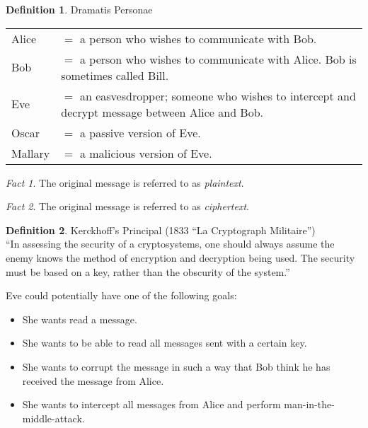 \documentclass[letterpaper,10pt,twoside]{report}
\theoremstyle{plain}
\theoremstyle{definition}
\newtheorem{definition}{Definition}[section]
\theoremstyle{remark}
\newtheorem*{fact}{Fact}
\begin{document}
\begin{definition}{Dramatis Personae}

\begin{tabular}{ll}
   Alice     & $ = $ a person who wishes to communicate with Bob. \\
   Bob       & $ = $ a person who wishes to communicate with Alice. Bob is sometimes called Bill. \\
   Eve       & $ = $ an easvesdropper; someone who wishes to intercept and decrypt message between Alice and Bob. \\
   Oscar     & $ = $ a passive version of Eve. \\
   Mallary   & $ = $ a malicious version of Eve. \\
\end{tabular}

\begin{fact}
   The original message is referred to as \emph{plaintext}.
\end{fact}

\begin{fact}
   The original message is referred to as \emph{ciphertext}.
\end{fact}

\end{definition}

\begin{definition}{Kerckhoff's Principal (1833 ``La Cryptograph Militaire'')} \\
``In assessing the security of a cryptosystems, one should always assume the enemy knows the method of encryption and decryption being used. The security must be based on a key, rather than the obscurity of the system.''
\end{definition}

Eve could potentially have one of the following goals:\\
\begin{itemize}
   \item{She wants read a message.}
   \item{She wants to be able to read all messages sent with a certain key.}
   \item{She wants to corrupt the message in such a way that Bob think he has received the message from Alice.}
   \item{She wants to intercept all messages from Alice and perform man-in-the-middle-attack.}
\end{itemize}
\end{document}
